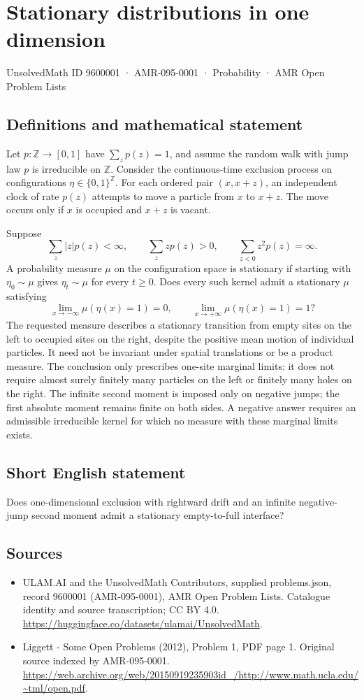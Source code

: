 \documentclass[11pt,a4paper]{article}
\begin{document}
\section*{Stationary distributions in one dimension}\label{9600001}
{\small UnsolvedMath ID 9600001 · AMR-095-0001 · Probability · AMR Open Problem Lists}
\subsection{Definitions and mathematical statement}
Let $p:\mathbb Z\to[0,1]$ have $\sum_zp(z)=1$, and assume the random walk with jump law $p$ is irreducible on $\mathbb Z$. Consider the continuous-time exclusion process on configurations $\eta\in\{0,1\}^{\mathbb Z}$. For each ordered pair $(x,x+z)$, an independent clock of rate $p(z)$ attempts to move a particle from $x$ to $x+z$. The move occurs only if $x$ is occupied and $x+z$ is vacant.

Suppose
\[
\sum_z|z|p(z)<\infty,\qquad
\sum_z z p(z)>0,\qquad
\sum_{z<0}z^2p(z)=\infty.
\]
A probability measure $\mu$ on the configuration space is stationary if starting with $\eta_0\sim\mu$ gives $\eta_t\sim\mu$ for every $t\ge0$. Does every such kernel admit a stationary $\mu$ satisfying
\[
\lim_{x\to-\infty}\mu(\eta(x)=1)=0,
\qquad \lim_{x\to+\infty}\mu(\eta(x)=1)=1?
\]
The requested measure describes a stationary transition from empty sites on the left to occupied sites on the right, despite the positive mean motion of individual particles. It need not be invariant under spatial translations or be a product measure. The conclusion only prescribes one-site marginal limits: it does not require almost surely finitely many particles on the left or finitely many holes on the right. The infinite second moment is imposed only on negative jumps; the first absolute moment remains finite on both sides. A negative answer requires an admissible irreducible kernel for which no measure with these marginal limits exists.
\subsection{Short English statement}
Does one-dimensional exclusion with rightward drift and an infinite negative-jump second moment admit a stationary empty-to-full interface?
\subsection{Sources}
\begin{itemize}
\item[S1] ULAM.AI and the UnsolvedMath Contributors, supplied problems.json, record 9600001 (AMR-095-0001), AMR Open Problem Lists. Catalogue identity and source transcription; CC BY 4.0.
\url{https://huggingface.co/datasets/ulamai/UnsolvedMath}.
\item[S2] Liggett - Some Open Problems (2012), Problem 1, PDF page 1. Original source indexed by AMR-095-0001.
\url{https://web.archive.org/web/20150919235903id_/http://www.math.ucla.edu/~tml/open.pdf}.
\end{itemize}
\end{document}
